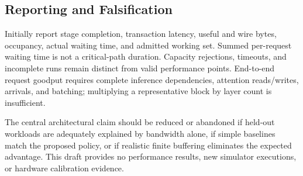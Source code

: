 \subsection{Reporting and Falsification}
Initially report stage completion, transaction latency, useful and wire
bytes, occupancy, actual waiting time, and admitted working set. Summed
per-request waiting time is not a critical-path duration. Capacity
rejections, timeouts, and incomplete runs remain distinct from valid
performance points. End-to-end request goodput requires complete
inference dependencies, attention reads/writes, arrivals, and batching;
multiplying a representative block by layer count is insufficient.

The central architectural claim should be reduced or abandoned if
held-out workloads are adequately explained by bandwidth alone, if simple
baselines match the proposed policy, or if realistic finite buffering
eliminates the expected advantage. This draft provides no performance
results, new simulator executions, or hardware calibration evidence.
